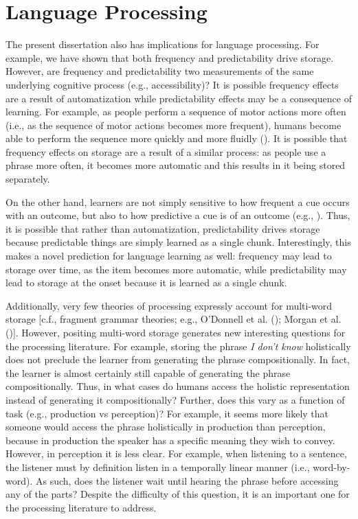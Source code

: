\documentclass[
  12pt,
  letterpaper,
]{scrreport}
\begin{document}
\section{Language Processing}\label{language-processing}

The present dissertation also has implications for language processing.
For example, we have shown that both frequency and predictability drive
storage. However, are frequency and predictability two measurements of
the same underlying cognitive process (e.g., accessibility)? It is
possible frequency effects are a result of automatization while
predictability effects may be a consequence of learning. For example, as
people perform a sequence of motor actions more often (i.e., as the
sequence of motor actions becomes more frequent), humans become able to
perform the sequence more quickly and more fluidly
(). It is
possible that frequency effects on storage are a result of a similar
process: as people use a phrase more often, it becomes more automatic
and this results in it being stored separately.

On the other hand, learners are not simply sensitive to how frequent a
cue occurs with an outcome, but also to how predictive a cue is of an
outcome (e.g.,
). Thus, it is possible that rather than automatization,
predictability drives storage because predictable things are simply
learned as a single chunk. Interestingly, this makes a novel prediction
for language learning as well: frequency may lead to storage over time,
as the item becomes more automatic, while predictability may lead to
storage at the onset because it is learned as a single chunk.

Additionally, very few theories of processing expressly account for
multi-word storage {[}c.f., fragment grammar theories; e.g., O'Donnell
et al. ();
Morgan et al.
(){]}. However,
positing multi-word storage generates new interesting questions for the
processing literature. For example, storing the phrase \emph{I don't
know} holistically does not preclude the learner from generating the
phrase compositionally. In fact, the learner is almost certainly still
capable of generating the phrase compositionally. Thus, in what cases do
humans access the holistic representation instead of generating it
compositionally? Further, does this vary as a function of task (e.g.,
production vs perception)? For example, it seems more likely that
someone would access the phrase holistically in production than
perception, because in production the speaker has a specific meaning
they wish to convey. However, in perception it is less clear. For
example, when listening to a sentence, the listener must by definition
listen in a temporally linear manner (i.e., word-by-word). As such, does
the listener wait until hearing the phrase before accessing any of the
parts? Despite the difficulty of this question, it is an important one
for the processing literature to address.
\end{document}
